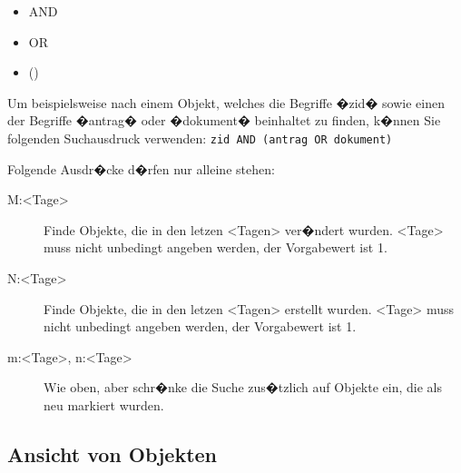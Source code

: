 \begin{itemize}
\item AND
\item OR
\item ()
\end{itemize}

\begin{Hinweis}
  Um beispielsweise nach einem Objekt, welches die Begriffe �zid�
  sowie einen der Begriffe �antrag� oder �dokument� beinhaltet zu
  finden, k�nnen Sie folgenden Suchausdruck verwenden: \texttt{zid AND
    (antrag OR dokument)}
\end{Hinweis}

Folgende Ausdr�cke d�rfen nur alleine stehen:

\begin{description}
\item[M:<Tage>] Finde Objekte, die in den letzen <Tagen> ver�ndert
  wurden. <Tage> muss nicht unbedingt angeben werden, der Vorgabewert
  ist 1.
\item[N:<Tage>] Finde Objekte, die in den letzen <Tagen> erstellt
  wurden. <Tage> muss nicht unbedingt angeben werden, der Vorgabewert
  ist 1.
\item[m:<Tage>, n:<Tage>] Wie oben, aber schr�nke die Suche zus�tzlich
  auf Objekte ein, die als neu markiert wurden.
\end{description}

%
%

\subsection{Ansicht von Objekten}

